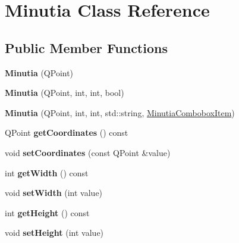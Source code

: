 \hypertarget{class_minutia}{}\section{Minutia Class Reference}
\label{class_minutia}
\subsection*{Public Member Functions}
\begin{DoxyCompactItemize}
\item 
\mbox{\label{class_minutia_a890c5b6b1ab2afd6a46aa36a5a2f6265}} 
{\bfseries Minutia} (Q\+Point)
\item 
\mbox{\label{class_minutia_ac5e66bbe97feb458750365382a8d91d0}} 
{\bfseries Minutia} (Q\+Point, int, int, bool)
\item 
\mbox{\label{class_minutia_a60e92bf8a86743eef30b2c210574be18}} 
{\bfseries Minutia} (Q\+Point, int, int, std\+::string, \mbox{\hyperlink{class_minutia_combobox_item}{Minutia\+Combobox\+Item}})
\item 
\mbox{\label{class_minutia_a2da938543b4d53ec287e69aebb470d83}} 
Q\+Point {\bfseries get\+Coordinates} () const
\item 
\mbox{\label{class_minutia_a25771dd4042e12c4c12de4ee3b9ad0b6}} 
void {\bfseries set\+Coordinates} (const Q\+Point \&value)
\item 
\mbox{\label{class_minutia_ab01526b6862cfb12e5e750fafd8ad375}} 
int {\bfseries get\+Width} () const
\item 
\mbox{\label{class_minutia_a1c8255a49c827252f056fbea4421410d}} 
void {\bfseries set\+Width} (int value)
\item 
\mbox{\label{class_minutia_a1000b8beba7b000abe6a3fa64ccff1b9}} 
int {\bfseries get\+Height} () const
\item 
\mbox{\label{class_minutia_ae05145b8e91c44f525c877782b261e47}} 
void {\bfseries set\+Height} (int value)
\item 
\mbox{\label{class_minutia_aba356ee6f01e0ad977ba55dceda958a7}} 

\end{DoxyCompactItemize}
